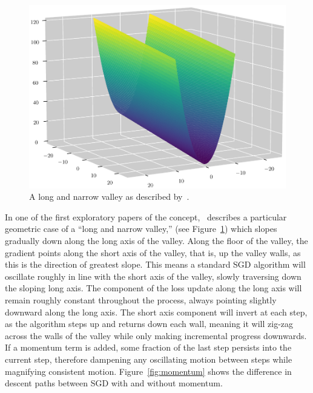 \begin{figure}[ht!]
	\centering
	\includegraphics[width=.5\textwidth]{momentum/long_and_narrow}
	\caption[Qian's long and narrow valley example]{A long and narrow valley as described by~\cite{qian1999}.}
	\label{fig:long_and_narrow}
\end{figure}

In one of the first
exploratory papers of the concept,~\cite{qian1999} describes a particular geometric case of a ``long and
narrow valley,'' (see Figure~\ref{fig:long_and_narrow}) which slopes gradually down along the long axis of the valley. Along the floor of the valley, the
gradient points along the short axis of the valley, that is, up the valley walls, as this is the direction of greatest slope.
This means a standard SGD algorithm will oscillate roughly in line with the short axis of the valley,
slowly traversing down the sloping long axis. The component of the loss update along the long axis will remain roughly
constant throughout the process, always pointing slightly downward along the long axis. The short axis component will
invert at each step, as the algorithm steps up and returns down each wall, meaning it will zig-zag across the walls of the valley while
only making incremental progress downwards. If a momentum term is added, some fraction of the last step persists into the current
step, therefore dampening any oscillating motion between steps while magnifying consistent motion. Figure~\ref{fig:momentum}
shows the difference in descent paths between SGD with and without momentum.

